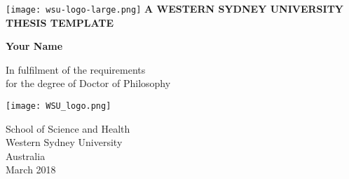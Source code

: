 \cleardoublepage
\renewcommand{\baselinestretch}{1.5}
\begin{titlepage}
    \begin{center}
        \vspace*{1cm}
        \texttt{[image: wsu-logo-large.png]}
         \LARGE
        \textbf{A WESTERN SYDNEY UNIVERSITY THESIS TEMPLATE} %
        \vspace{1cm}
        
        \large\textbf{Your Name}
        
        \vspace{0.25cm}
        \normalsize
        In fulfilment of the requirements\\
        for the degree of Doctor of Philosophy
        
        \vspace{0.25cm}
        
 
        \texttt{[image: WSU\_logo.png]}
        \vfill
    
              
        \large
        School of Science and Health\\
        Western Sydney University\\
        Australia\\
        March 2018
        
    \end{center}
\end{titlepage}
